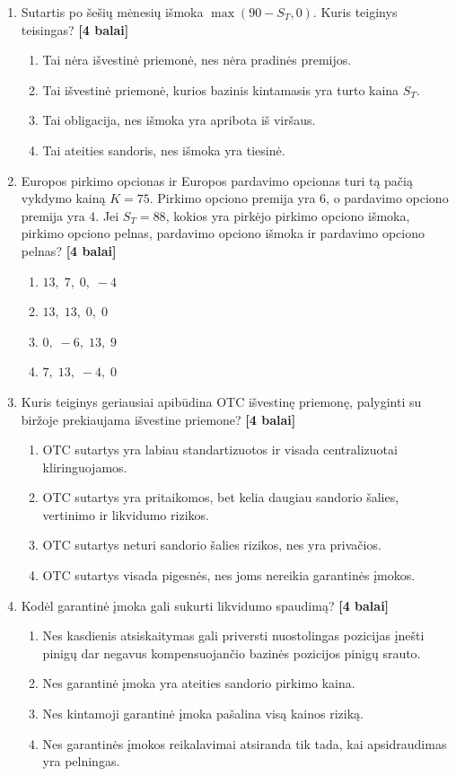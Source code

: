 \documentclass[11pt]{article}
\newcommand{\pts}[1]{\hspace{0.35em}\textnormal{\textbf{[#1 balai]}}}
\newenvironment{choices}{\begin{enumerate}[label=\Alph*.,leftmargin=2.2em,itemsep=0.12em,topsep=0.12em]}{\end{enumerate}}
\begin{document}
\begin{enumerate}
    \item Sutartis po šešių mėnesių išmoka $\max(90-S_T,0)$. Kuris teiginys
    teisingas? \pts{4}
    \begin{choices}
        \item Tai nėra išvestinė priemonė, nes nėra pradinės premijos.
        \item Tai išvestinė priemonė, kurios bazinis kintamasis yra turto kaina $S_T$.
        \item Tai obligacija, nes išmoka yra apribota iš viršaus.
        \item Tai ateities sandoris, nes išmoka yra tiesinė.
    \end{choices}

    \item Europos pirkimo opcionas ir Europos pardavimo opcionas turi tą pačią
    vykdymo kainą $K=75$. Pirkimo opciono premija yra 6, o pardavimo opciono
    premija yra 4. Jei $S_T=88$, kokios yra pirkėjo pirkimo opciono išmoka,
    pirkimo opciono pelnas, pardavimo opciono išmoka ir pardavimo opciono
    pelnas? \pts{4}
    \begin{choices}
        \item $13,\;7,\;0,\;-4$
        \item $13,\;13,\;0,\;0$
        \item $0,\;-6,\;13,\;9$
        \item $7,\;13,\;-4,\;0$
    \end{choices}

    \item Kuris teiginys geriausiai apibūdina OTC išvestinę priemonę, palyginti
    su biržoje prekiaujama išvestine priemone? \pts{4}
    \begin{choices}
        \item OTC sutartys yra labiau standartizuotos ir visada centralizuotai kliringuojamos.
        \item OTC sutartys yra pritaikomos, bet kelia daugiau sandorio šalies,
        vertinimo ir likvidumo rizikos.
        \item OTC sutartys neturi sandorio šalies rizikos, nes yra privačios.
        \item OTC sutartys visada pigesnės, nes joms nereikia garantinės įmokos.
    \end{choices}

    \item Kodėl garantinė įmoka gali sukurti likvidumo spaudimą? \pts{4}
    \begin{choices}
        \item Nes kasdienis atsiskaitymas gali priversti nuostolingas pozicijas
        įnešti pinigų dar negavus kompensuojančio bazinės pozicijos pinigų srauto.
        \item Nes garantinė įmoka yra ateities sandorio pirkimo kaina.
        \item Nes kintamoji garantinė įmoka pašalina visą kainos riziką.
        \item Nes garantinės įmokos reikalavimai atsiranda tik tada, kai
        apsidraudimas yra pelningas.
    \end{choices}
\end{enumerate}
\end{document}
